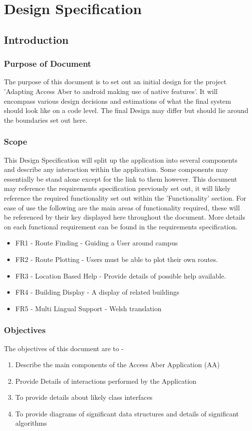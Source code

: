 \chapter{Design Specification}
\tableofcontents
\newpage
\section{Introduction}
\subsection{Purpose of Document}
The purpose of this document is to set out an initial design for the project 'Adapting Access Aber to android making use of native features'. It will encompass various design decisions and estimations of what the final system should look like on a code level. The final Design may differ but should lie around the boundaries set out here.
\subsection{Scope}
This Design Specification will split up the application into several components and describe any interaction within the application. Some components may essentially be stand alone except for the link to them however. This document may reference the requirements specification previously set out, it will likely reference the required functionality set out within the 'Functionality' section. For ease of use the following are the main areas of functionality required, these will be referenced by their key displayed here throughout the document. More details on each functional requirement can be found in the requirements specification.

\begin{itemize}
	\item FR1 - Route Finding - Guiding a User around campus
	\item FR2 - Route Plotting - Users must be able to plot their own routes.
	\item FR3 - Location Based Help - Provide details of possible help available.
	\item FR4 - Building Display - A display of related buildings
	\item FR5 - Multi Lingual Support - Welsh translation
\end{itemize}
 

\subsection{Objectives}
The objectives of this document are to - 
\begin{enumerate}
\item Describe the main components of the Access Aber Application (AA)\cite{aa}
\item Provide Details of interactions performed by the Application
\item To provide details about likely class interfaces
\item To provide diagrams of significant data structures and details of significant algorithms 
\end{enumerate}
\newpage
